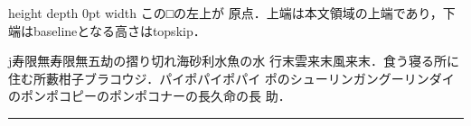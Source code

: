 \documentclass[a4j, twocolumn, twoside]{jsarticle}
\begin{document}
\noindent \vrule height \topskip depth 0pt width \topskip
この□の左上が
原点．上端は本文領域の上端であり，下端はbaselineとなる高さはtopskip．

j寿限無寿限無五劫の摺り切れ海砂利水魚の水
行末雲来末風来末．食う寝る所に住む所藪柑子ブラコウジ．パイポパイポパイ
ポのシューリンガングーリンダイのポンポコピーのポンポコナーの長久命の長
助．

\hrule
\end{document}
